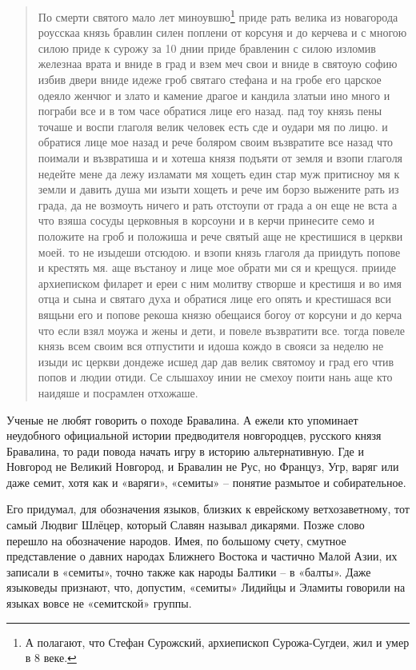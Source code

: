 \begin{quotation}
По смерти святого мало лет миноувшю\footnote{А полагают, что Стефан Сурожский, архиепископ Сурожа-Сугдеи, жил и умер в 8 веке.} приде рать велика из новагорода роусскаа князь бравлин силен поплени от корсуня и до керчева и с многою силою приде к сурожу за 10 днии приде бравленин с силою изломив железнаа врата и вниде в град и взем меч свои и вниде в святоую софию избив двери вниде идеже гроб святаго стефана и на гробе его царское одеяло женчюг и злато и камение драгое и кандила златыи ино много и пограби все и в том часе обратися лице его назад. пад тоу князь пены точаше и воспи глаголя велик человек есть сде и оудари мя по лицю. и обратися лице мое назад и рече боляром своим възвратите все назад что поимали и възвратиша и и хотеша князя подъяти от земля и взопи глаголя недейте мене да лежу изламати мя хощеть един стар муж притисноу мя к земли и давить душа ми изыти хощеть и рече им борзо выжените рать из града, да не возмоуть ничего и рать отстоупи от града а он еще не вста а что взяша сосуды церковныя в корсоуни и в керчи принесите семо и положите на гроб и положиша и рече святый аще не крестишися в церкви моей. то не изыдеши отсюдою. и взопи князь глаголя да приидуть попове и крестять мя. аще въстаноу и лице мое обрати ми ся и крещуся. прииде архиеписком филарет и ереи с ним молитву створше и крестишя и во имя отца и сына и святаго духа и обратися лице его опять и крестишася вси вящьни его и попове рекоша князю обещаися богоу от корсуни и до керча что если взял моужа и жены и дети, и повеле възвратити все. тогда повеле князь всем своим вся отпустити и идоша кождо в свояси за неделю не изыди ис церкви дондеже исшед дар дав велик святомоу и град его чтив попов и людии отиди. Се слышахоу инии не смехоу поити нань аще кто наидяше и посрамлен отхожаше.
\end{quotation}

Ученые не любят говорить о походе Бравалина. А ежели кто упоминает неудобного официальной истории предводителя новгородцев, русского князя Бравалина, то ради повода начать игру в историю альтернативную. Где и Новгород не Великий Новгород, и Бравалин не Рус, но Француз, Угр, варяг или даже семит, хотя как и «варяги», «семиты» – понятие размытое и собирательное.

Его придумал, для обозначения языков, близких к еврейскому ветхозаветному, тот самый Людвиг Шлёцер, который Славян называл дикарями. Позже слово перешло на обозначение народов. Имея, по большому счету, смутное представление о давних народах Ближнего Востока и частично Малой Азии, их записали в «семиты», точно также как народы Балтики – в «балты». Даже языковеды признают, что, допустим, «семиты» Лидийцы и Эламиты говорили на языках вовсе не «семитской» группы.

